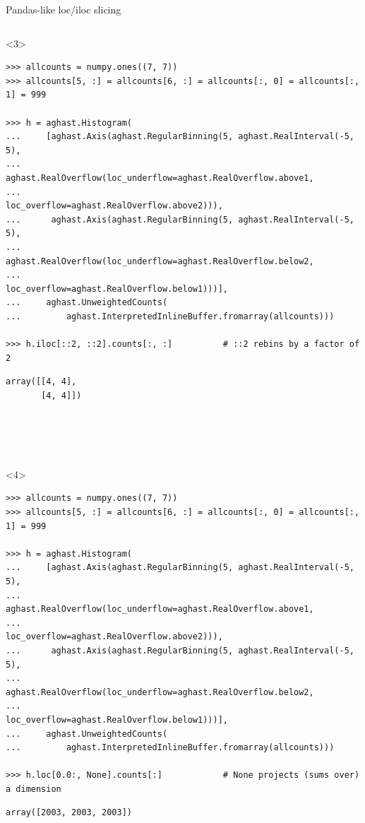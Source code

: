 \documentclass[aspectratio=169]{beamer}
\begin{document}
\begin{frame}[fragile]{Pandas-like loc/iloc slicing}
\begin{onlyenv}
\begin{verbatim}
\end{verbatim}
\end{onlyenv}
\begin{onlyenv}<3>
\begin{verbatim}
>>> allcounts = numpy.ones((7, 7))
>>> allcounts[5, :] = allcounts[6, :] = allcounts[:, 0] = allcounts[:, 1] = 999

>>> h = aghast.Histogram(
...     [aghast.Axis(aghast.RegularBinning(5, aghast.RealInterval(-5, 5),
...                  aghast.RealOverflow(loc_underflow=aghast.RealOverflow.above1,
...                                      loc_overflow=aghast.RealOverflow.above2))),
...      aghast.Axis(aghast.RegularBinning(5, aghast.RealInterval(-5, 5),
...                  aghast.RealOverflow(loc_underflow=aghast.RealOverflow.below2,
...                                      loc_overflow=aghast.RealOverflow.below1)))],
...     aghast.UnweightedCounts(
...         aghast.InterpretedInlineBuffer.fromarray(allcounts)))

>>> h.iloc[::2, ::2].counts[:, :]          # ::2 rebins by a factor of 2
\end{verbatim}
\begin{verbatim}
array([[4, 4], 
       [4, 4]])





\end{verbatim}
\end{onlyenv}
\begin{onlyenv}<4>
\begin{verbatim}
>>> allcounts = numpy.ones((7, 7))
>>> allcounts[5, :] = allcounts[6, :] = allcounts[:, 0] = allcounts[:, 1] = 999

>>> h = aghast.Histogram(
...     [aghast.Axis(aghast.RegularBinning(5, aghast.RealInterval(-5, 5),
...                  aghast.RealOverflow(loc_underflow=aghast.RealOverflow.above1,
...                                      loc_overflow=aghast.RealOverflow.above2))),
...      aghast.Axis(aghast.RegularBinning(5, aghast.RealInterval(-5, 5),
...                  aghast.RealOverflow(loc_underflow=aghast.RealOverflow.below2,
...                                      loc_overflow=aghast.RealOverflow.below1)))],
...     aghast.UnweightedCounts(
...         aghast.InterpretedInlineBuffer.fromarray(allcounts)))

>>> h.loc[0.0:, None].counts[:]            # None projects (sums over) a dimension
\end{verbatim}
\begin{verbatim}
array([2003, 2003, 2003])







\end{verbatim}
\end{onlyenv}
\end{frame}
\end{document}
